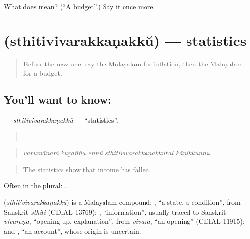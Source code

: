 \begin{tcolorbox}[breakable,colback=teal!4,colframe=teal!35!black,title={Before you move on}]
What does  mean? (\textquotedblleft{}A budget\textquotedblright{}.) Say it once more.
\end{tcolorbox}
\section[\texorpdfstring{\ml{സ്ഥിതിവിവരക്കണക്ക്} (sthitivivarakkaṇakkŭ)}{സ്ഥിതിവിവരക്കണക്ക് (sthitivivarakkaṇakkŭ)}]{ (sthitivivarakkaṇakkŭ) — statistics}

\label{lesson:ML-C428-sthitivivarakkanakku}



\begin{quote}
Before the new one: say the Malayalam for inflation, then the Malayalam for a budget.
\end{quote}

\subsection*{You'll want to know: }
\textbf{} — \emph{sthitivivarakkaṇakkŭ} — \textquotedblleft{}statistics\textquotedblright{}.

\begin{quote}
    .
\end{quote}

\begin{quote}
\emph{varumānaṁ kuṟaññu ennŭ sthitivivarakkaṇakkukaḷ kāṇikkunnu.}
\end{quote}

\begin{quote}
The statistics show that income has fallen.
\end{quote}

Often in the plural: .

\begin{cousinweb}
\textbf{} (\emph{sthitivivarakkaṇakkŭ}) is a Malayalam compound: , \textquotedblleft{}a state, a condition\textquotedblright{}, from Sanskrit \emph{sthiti} (CDIAL 13769); , \textquotedblleft{}information\textquotedblright{}, usually traced to Sanskrit \emph{vivaraṇa}, \textquotedblleft{}opening up, explanation\textquotedblright{}, from \emph{vivara}, \textquotedblleft{}an opening\textquotedblright{} (CDIAL 11915); and , \textquotedblleft{}an account\textquotedblright{}, whose origin is uncertain.
\end{cousinweb}

